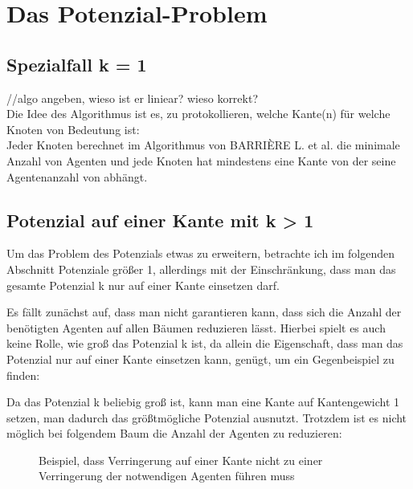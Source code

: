 \section{Das Potenzial-Problem}

\subsection{Spezialfall k = 1}
//algo angeben, wieso ist er liniear? wieso korrekt?\\


Die Idee des Algorithmus ist es, zu protokollieren, welche Kante(n) für welche Knoten von Bedeutung ist:\\

Jeder Knoten berechnet im Algorithmus von BARRIÈRE L. et al. die minimale Anzahl von Agenten und jede Knoten hat mindestens eine Kante von der seine Agentenanzahl von abhängt.

\subsection{Potenzial auf einer Kante mit k > 1}

Um das Problem des Potenzials etwas zu erweitern, betrachte ich im folgenden Abschnitt Potenziale größer 1, allerdings mit der Einschränkung, dass man das gesamte Potenzial k nur auf einer Kante einsetzen darf.

Es fällt zunächst auf, dass man nicht garantieren kann, dass sich die Anzahl der benötigten Agenten auf allen Bäumen reduzieren lässt. Hierbei spielt es auch keine Rolle, wie groß das Potenzial k ist, da allein die Eigenschaft, dass man das Potenzial nur auf einer Kante einsetzen kann, genügt, um ein Gegenbeispiel zu finden:

Da das Potenzial k beliebig groß ist, kann man eine Kante auf Kantengewicht 1 setzen, man dadurch das größtmögliche Potenzial ausnutzt. Trotzdem ist es nicht möglich bei folgendem Baum die Anzahl der Agenten zu reduzieren:

\begin{figure}[h]
	\hfill
	\caption{Beispiel, dass Verringerung auf einer Kante nicht zu einer Verringerung der notwendigen Agenten führen muss} 
\end{figure} 

